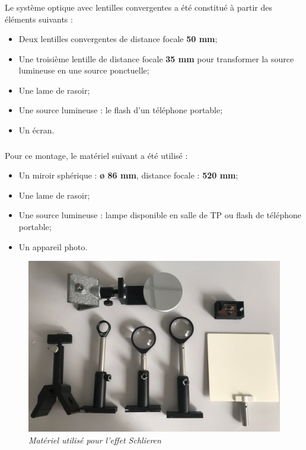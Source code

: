 \subsubsection{}
Le système optique avec lentilles convergentes a été constitué à partir des éléments suivants :
\begin{itemize}
	\item Deux lentilles convergentes de distance focale \textbf{50 mm};
	\item Une troisième lentille de distance focale \textbf{35 mm} pour transformer la source lumineuse en une source ponctuelle; 
	\item Une lame de rasoir;
	\item Une source lumineuse : le flash d'un téléphone portable;
	\item Un écran.
\end{itemize}
\subsubsection{}
Pour ce montage, le matériel suivant a été utilisé :
\begin{itemize}
	\item Un miroir sphérique : \textbf{ø 86 mm}, distance focale : \textbf{520 mm};
	\item Une lame de rasoir;
	\item Une source lumineuse : lampe disponible en salle de TP ou flash de téléphone portable;
	\item Un appareil photo.
\end{itemize}
\begin{figure}[H]
	\centering
	\includegraphics[scale = 0.15]{figures/materiel.jpg}
	\caption{\small{\textit{Matériel utilisé pour l'effet Schlieren}}}
	\label{fig:materiel}
\end{figure}
